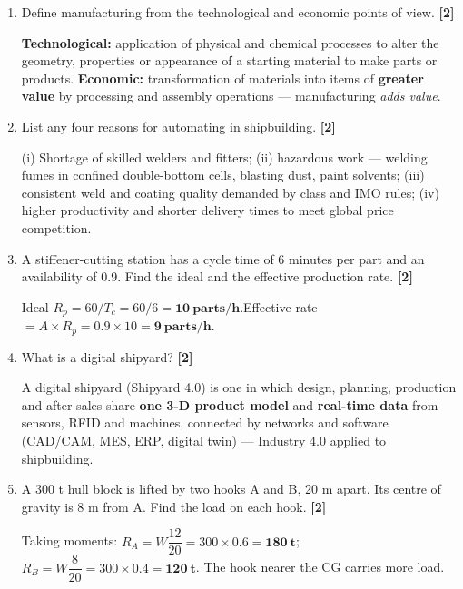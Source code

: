 \documentclass[11pt,a4paper]{article}
\newcommand{\qmarks}[1]{\hfill\textbf{[#1]}}
\begin{document}
	\begin{enumerate}

		\item Define manufacturing from the technological and economic points of view. \qmarks{2}
		\begin{answer}
			\textbf{Technological:} application of physical and chemical processes to alter the geometry, properties or appearance of a starting material to make parts or products. \textbf{Economic:} transformation of materials into items of \textbf{greater value} by processing and assembly operations --- manufacturing \emph{adds value}.
		\end{answer}

		\item List any four reasons for automating in shipbuilding. \qmarks{2}
		\begin{answer}
			(i) Shortage of skilled welders and fitters; (ii) hazardous work --- welding fumes in confined double-bottom cells, blasting dust, paint solvents; (iii) consistent weld and coating quality demanded by class and IMO rules; (iv) higher productivity and shorter delivery times to meet global price competition.
		\end{answer}

		\item A stiffener-cutting station has a cycle time of 6 minutes per part and an availability of 0.9. Find the ideal and the effective production rate. \qmarks{2}
		\begin{answer}
			Ideal $R_p = 60/T_c = 60/6 = \mathbf{10\ parts/h}$.\quad Effective rate $= A\times R_p = 0.9\times10 = \mathbf{9\ parts/h}$.
		\end{answer}

		\item What is a digital shipyard? \qmarks{2}
		\begin{answer}
			A digital shipyard (Shipyard 4.0) is one in which design, planning, production and after-sales share \textbf{one 3-D product model} and \textbf{real-time data} from sensors, RFID and machines, connected by networks and software (CAD/CAM, MES, ERP, digital twin) --- Industry 4.0 applied to shipbuilding.
		\end{answer}

		\item A 300 t hull block is lifted by two hooks A and B, 20 m apart. Its centre of gravity is 8 m from A. Find the load on each hook. \qmarks{2}
		\begin{answer}
			Taking moments: $R_A = W\dfrac{12}{20} = 300\times0.6 = \mathbf{180\ t}$;\quad $R_B = W\dfrac{8}{20} = 300\times0.4 = \mathbf{120\ t}$. The hook nearer the CG carries more load.
		\end{answer}

	\end{enumerate}
\end{document}
